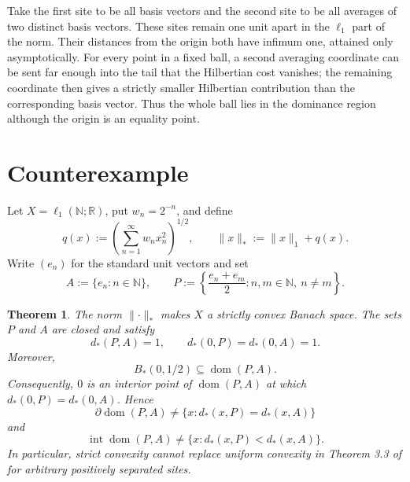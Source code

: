 \documentclass[11pt]{article}
\newtheorem{theorem}{Theorem}
\newcommand{\Nstar}{\lVert\cdot\rVert_*}
\DeclareMathOperator{\domreg}{dom}
\begin{document}
Take the first site to be all basis vectors and the second site to be all averages of two distinct basis vectors. These sites remain one unit apart in the $\ell_1$ part of the norm. Their distances from the origin both have infimum one, attained only asymptotically. For every point in a fixed ball, a second averaging coordinate can be sent far enough into the tail that the Hilbertian cost vanishes; the remaining coordinate then gives a strictly smaller Hilbertian contribution than the corresponding basis vector. Thus the whole ball lies in the dominance region although the origin is an equality point.

\section{Counterexample}

Let $X=\ell_1(\mathbb N;\mathbb R)$, put $w_n=2^{-n}$, and define
\[
 q(x):=\left(\sum_{n=1}^{\infty}w_nx_n^2\right)^{1/2},
 \qquad
 \lVert x\rVert_*:=\lVert x\rVert_1+q(x).
\]
Write $(e_n)$ for the standard unit vectors and set
\[
 A:=\{e_n:n\in\mathbb N\},
 \qquad
 P:=\left\{\frac{e_n+e_m}{2}:n,m\in\mathbb N,\ n\ne m\right\}.
\]

\begin{theorem}
The norm $\Nstar$ makes $X$ a strictly convex Banach space. The sets $P$ and $A$ are closed and satisfy
\[
 d_*(P,A)=1,
 \qquad
 d_*(0,P)=d_*(0,A)=1.
\]
Moreover,
\[
 B_*(0,1/2)\subseteq \domreg(P,A).
\]
Consequently, $0$ is an interior point of $\domreg(P,A)$ at which $d_*(0,P)=d_*(0,A)$. Hence
\[
 \partial\domreg(P,A)\ne\{x:d_*(x,P)=d_*(x,A)\}
\]
and
\[
 \operatorname{int}\domreg(P,A)\ne\{x:d_*(x,P)<d_*(x,A)\}.
\]
In particular, strict convexity cannot replace uniform convexity in Theorem 3.3 of \cite{Reem} for arbitrary positively separated sites.
\end{theorem}
\end{document}
